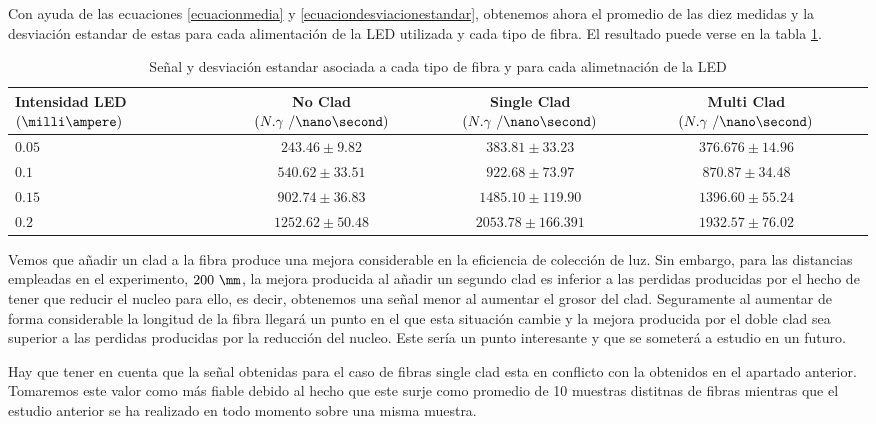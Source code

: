Con ayuda de las ecuaciones \ref{ecuacionmedia} y \ref{ecuaciondesviacionestandar}, obtenemos ahora el promedio de las diez medidas y la desviación estandar de estas para cada alimentación de la LED utilizada y cada tipo de fibra. El resultado puede verse en la tabla \ref{senalydesviacion}.

\begin{table}[H]
\begin{center}
\begin{tabular}{l | c | c | c | c }
Intensidad LED $(\milli\ampere)$ &  No Clad $(N.\gamma~/\nano\second)$ & Single Clad $(N.\gamma~/\nano\second)$ & Multi Clad $(N.\gamma~/\nano\second)$ \\
\hline \hline
$0.05$ & $243.46 \pm 9.82$ & $383.81 \pm 33.23$ & $376.676 \pm 14.96$\\ 
$0.1$ & $540.62 \pm 33.51$ & $922.68 \pm 73.97$ & $870.87 \pm 34.48$\\
$0.15$ & $902.74 \pm 36.83$ & $1485.10 \pm 119.90$ & $1396.60 \pm 55.24$\\
$0.2$ & $1252.62 \pm 50.48$ & $2053.78 \pm 166.391$ & $1932.57 \pm 76.02$\\

\end{tabular}
\caption{Señal y desviación estandar asociada a cada tipo de fibra y para cada alimetnación de la LED\label{senalydesviacion}}
\end{center}
\end{table}

Vemos que añadir un clad a la fibra produce una mejora considerable en la eficiencia de colección de luz. Sin embargo, para las distancias empleadas en el experimento, $200~\mm$, la mejora producida al añadir un segundo clad es inferior a las perdidas producidas por el hecho de tener que reducir el nucleo para ello, es decir, obtenemos una señal menor al aumentar el grosor del clad. Seguramente al aumentar de forma considerable la longitud de la fibra llegará un punto en el que esta situación cambie y la mejora producida por el doble clad sea superior a las perdidas producidas por la reducción del nucleo. Este sería un punto interesante y que se someterá a estudio en un futuro.

Hay que tener en cuenta que la señal obtenidas para el caso de fibras single clad esta en conflicto con la obtenidos en el apartado anterior. Tomaremos este valor como más fiable debido al hecho que este surje como promedio de 10 muestras distitnas de fibras mientras que el estudio anterior se ha realizado en todo momento sobre una misma muestra.


